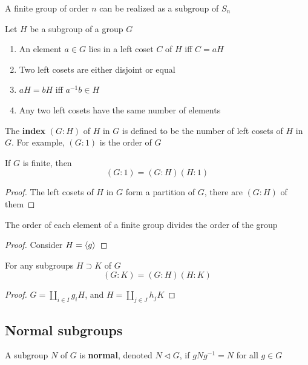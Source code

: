 \documentclass[11pt]{article}
\begin{document}
\begin{corollary}[]
A finite group of order \(n\) can be realized as a subgroup of \(S_n\)
\end{corollary}

\begin{proposition}[]
Let \(H\) be a subgroup of a group \(G\)
\begin{enumerate}
\item An element \(a\in G\)  lies in a left coset \(C\) of \(H\) iff \(C=aH\)
\item Two left cosets are either disjoint or equal
\item \(aH=bH\) iff \(a^{-1}b\in H\)
\item Any two left cosets have the same number of elements
\end{enumerate}
\end{proposition}

The \textbf{index} \((G:H)\) of \(H\) in \(G\) is defined to be the number of left cosets of \(H\)
in \(G\). For example, \((G:1)\) is the order of \(G\)

\begin{theorem}[Lagrange]
If \(G\) is finite, then
\begin{equation*}
(G:1)=(G:H)(H:1)
\end{equation*}
\end{theorem}

\begin{proof}
The left cosets of \(H\) in \(G\) form a partition of \(G\), there are \((G:H)\) of them
\end{proof}

\begin{corollary}[]
The order of each element of a finite group divides the order of the group
\end{corollary}

\begin{proof}
Consider \(H=\langle g\rangle\)
\end{proof}

\begin{proposition}[]
For any subgroups \(H\supset K\) of \(G\)
\begin{equation*}
(G:K)=(G:H)(H:K)
\end{equation*}
\end{proposition}

\begin{proof}
\(G=\coprod_{i\in I}g_iH\), and \(H=\coprod_{j\in J}h_jK\)
\end{proof}
\subsection{Normal subgroups}
\label{sec:orgea466f1}
A subgroup \(N\) of \(G\) is \textbf{normal}, denoted \(N\lhd G\), if \(gNg^{-1}=N\) for all \(g\in G\)
\end{document}
